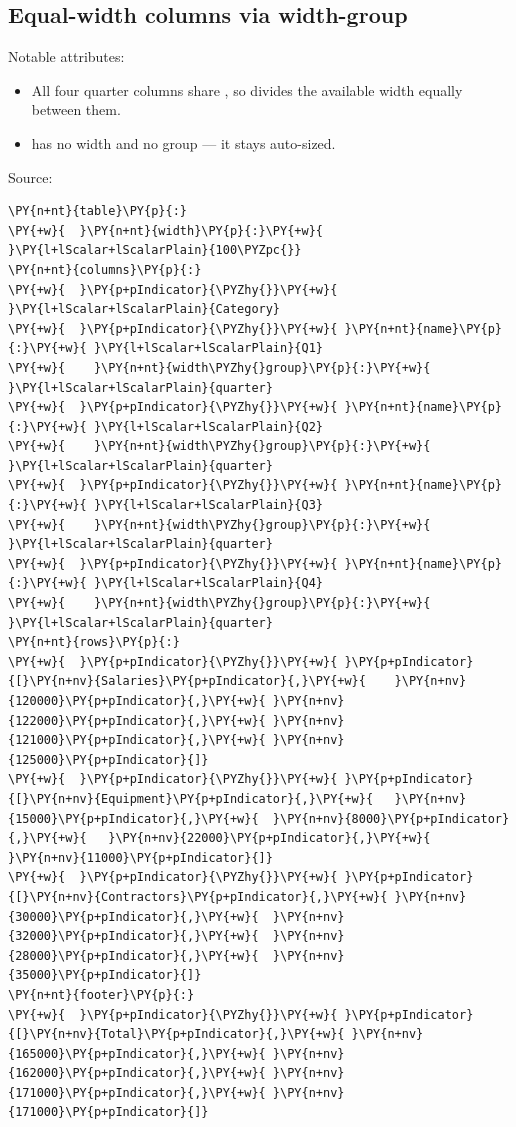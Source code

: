 \documentclass[a4paper,twoside]{article}
\begin{document}
\subsection{Equal-width columns via width-group}
Notable attributes:
\begin{itemize}
\item All four quarter columns share , so 
divides the available width equally between them.
\item {} has no width and no group --- it stays auto-sized.
\end{itemize}
Source:
\begin{tscode}[lang=yaml, engine=pygments]
\begin{Verbatim}[commandchars=\\\{\},breaklines, breakanywhere, commandchars=\\\{\}]
\PY{n+nt}{table}\PY{p}{:}
\PY{+w}{  }\PY{n+nt}{width}\PY{p}{:}\PY{+w}{ }\PY{l+lScalar+lScalarPlain}{100\PYZpc{}}
\PY{n+nt}{columns}\PY{p}{:}
\PY{+w}{  }\PY{p+pIndicator}{\PYZhy{}}\PY{+w}{ }\PY{l+lScalar+lScalarPlain}{Category}
\PY{+w}{  }\PY{p+pIndicator}{\PYZhy{}}\PY{+w}{ }\PY{n+nt}{name}\PY{p}{:}\PY{+w}{ }\PY{l+lScalar+lScalarPlain}{Q1}
\PY{+w}{    }\PY{n+nt}{width\PYZhy{}group}\PY{p}{:}\PY{+w}{ }\PY{l+lScalar+lScalarPlain}{quarter}
\PY{+w}{  }\PY{p+pIndicator}{\PYZhy{}}\PY{+w}{ }\PY{n+nt}{name}\PY{p}{:}\PY{+w}{ }\PY{l+lScalar+lScalarPlain}{Q2}
\PY{+w}{    }\PY{n+nt}{width\PYZhy{}group}\PY{p}{:}\PY{+w}{ }\PY{l+lScalar+lScalarPlain}{quarter}
\PY{+w}{  }\PY{p+pIndicator}{\PYZhy{}}\PY{+w}{ }\PY{n+nt}{name}\PY{p}{:}\PY{+w}{ }\PY{l+lScalar+lScalarPlain}{Q3}
\PY{+w}{    }\PY{n+nt}{width\PYZhy{}group}\PY{p}{:}\PY{+w}{ }\PY{l+lScalar+lScalarPlain}{quarter}
\PY{+w}{  }\PY{p+pIndicator}{\PYZhy{}}\PY{+w}{ }\PY{n+nt}{name}\PY{p}{:}\PY{+w}{ }\PY{l+lScalar+lScalarPlain}{Q4}
\PY{+w}{    }\PY{n+nt}{width\PYZhy{}group}\PY{p}{:}\PY{+w}{ }\PY{l+lScalar+lScalarPlain}{quarter}
\PY{n+nt}{rows}\PY{p}{:}
\PY{+w}{  }\PY{p+pIndicator}{\PYZhy{}}\PY{+w}{ }\PY{p+pIndicator}{[}\PY{n+nv}{Salaries}\PY{p+pIndicator}{,}\PY{+w}{    }\PY{n+nv}{120000}\PY{p+pIndicator}{,}\PY{+w}{ }\PY{n+nv}{122000}\PY{p+pIndicator}{,}\PY{+w}{ }\PY{n+nv}{121000}\PY{p+pIndicator}{,}\PY{+w}{ }\PY{n+nv}{125000}\PY{p+pIndicator}{]}
\PY{+w}{  }\PY{p+pIndicator}{\PYZhy{}}\PY{+w}{ }\PY{p+pIndicator}{[}\PY{n+nv}{Equipment}\PY{p+pIndicator}{,}\PY{+w}{   }\PY{n+nv}{15000}\PY{p+pIndicator}{,}\PY{+w}{  }\PY{n+nv}{8000}\PY{p+pIndicator}{,}\PY{+w}{   }\PY{n+nv}{22000}\PY{p+pIndicator}{,}\PY{+w}{  }\PY{n+nv}{11000}\PY{p+pIndicator}{]}
\PY{+w}{  }\PY{p+pIndicator}{\PYZhy{}}\PY{+w}{ }\PY{p+pIndicator}{[}\PY{n+nv}{Contractors}\PY{p+pIndicator}{,}\PY{+w}{ }\PY{n+nv}{30000}\PY{p+pIndicator}{,}\PY{+w}{  }\PY{n+nv}{32000}\PY{p+pIndicator}{,}\PY{+w}{  }\PY{n+nv}{28000}\PY{p+pIndicator}{,}\PY{+w}{  }\PY{n+nv}{35000}\PY{p+pIndicator}{]}
\PY{n+nt}{footer}\PY{p}{:}
\PY{+w}{  }\PY{p+pIndicator}{\PYZhy{}}\PY{+w}{ }\PY{p+pIndicator}{[}\PY{n+nv}{Total}\PY{p+pIndicator}{,}\PY{+w}{ }\PY{n+nv}{165000}\PY{p+pIndicator}{,}\PY{+w}{ }\PY{n+nv}{162000}\PY{p+pIndicator}{,}\PY{+w}{ }\PY{n+nv}{171000}\PY{p+pIndicator}{,}\PY{+w}{ }\PY{n+nv}{171000}\PY{p+pIndicator}{]}
\end{Verbatim}
\end{tscode}
\end{document}
